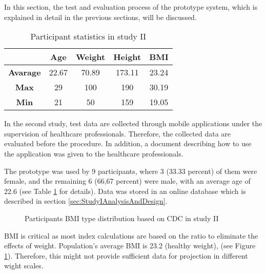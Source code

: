 In this section, the test and evaluation process of the prototype system, which is explained in detail in the previous sections, will be discussed.

\begin{table}[htbp]
\begin{center}
\caption{Participant statistics in study II}
\vspace{23pt}
      \begin{tabular}{|c|c|c|c|c|} \hline
          & \textbf{Age} & \textbf{Weight} & \textbf{Height} & \textbf{BMI} \\ \hline
        \textbf{Avarage} & 22.67 & 70.89 & 173.11 & 23.24 \\ \hline
        \textbf{Max} & 29 & 100 & 190 & 30.19 \\ \hline
        \textbf{Min} & 21 & 50 & 159 & 19.05 \\ \hline
    \end{tabular}
\label{tab:StudyIIParticipantStatistics}
\end{center}
\end{table}

In the second study, test data are collected through mobile applications under the supervision of healthcare professionals. Therefore, the collected data are evaluated before the procedure. In addition, a document describing how to use the application was given to the healthcare professionals.

The prototype was used by 9 participants, where 3 (33.33 percent) of them were female, and the remaining 6 (66,67 percent) were male, with an average age of 22.6 (see Table \ref{tab:StudyIIParticipantStatistics} for details). Data was stored in an online database which is described in section \ref{sec:StudyIAnalysisAndDesign}.

\begin{figure}[htbp]
\centering
{}
\caption{Participants BMI type distribution based on CDC in study II}
\label{fig:StudyIIParticipantsBMITypeDistribution}
\end{figure}

BMI is critical as most index calculations are based on the ratio to eliminate the effects of weight. Population's average BMI is 23.2 (healthy weight), (see Figure \ref{fig:StudyIIParticipantsBMITypeDistribution}). Therefore, this might not provide sufficient data for projection in different wight scales.

